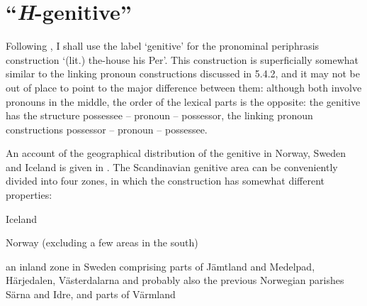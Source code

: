 
\section{“\textit{H}{}-genitive”}
\label{bkm:Ref154988643}
Following \citet{Delsing2003b}, I shall use the label ‘genitive’ for the pronominal periphrasis construction  ‘(lit.) the-house his Per’. This construction is superficially somewhat similar to the linking pronoun constructions discussed in 5.4.2, and it may not be out of place to point to the major difference between them: although both involve pronouns in the middle, the order of the lexical parts is the opposite: the genitive has the structure possessee – pronoun – possessor, the linking pronoun constructions possessor – pronoun – possessee.


An account of the geographical distribution of the genitive in Norway, Sweden and Iceland is given in \citet[34]{Delsing2003a}. The Scandinavian genitive area can be conveniently divided into four zones, in which the construction has somewhat different properties:


\item 

Iceland


\item 

Norway (excluding a few areas in the south) 


\item 

an inland zone in Sweden comprising parts of Jämtland and Medelpad, Härjedalen, Västerdalarna and probably also the previous Norwegian parishes Särna and Idre, and parts of Värmland

